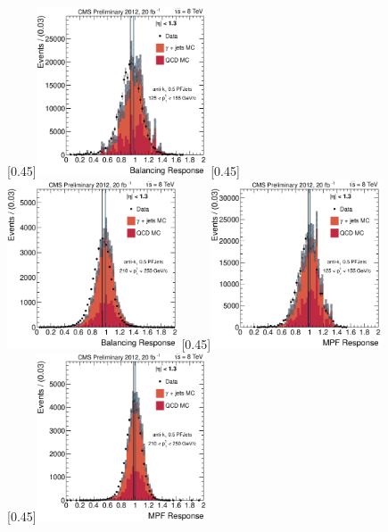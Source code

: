 \begin{figure}[p]
    \centering
    \subcaptionbox{\label{fig:bal_eta013_pt_125_155}}[0.45\textwidth]{\includegraphics[width=0.45\textwidth]{chapitre4/figs/resp_balancing_eta013_ptPhot_125_155.eps}}\hfill
    \subcaptionbox{\label{fig:bal_eta013_pt_210_250}}[0.45\textwidth]{\includegraphics[width=0.45\textwidth]{chapitre4/figs/resp_balancing_eta013_ptPhot_210_250.eps}}
    \subcaptionbox{\label{fig:mpf_eta013_pt_125_155}}[0.45\textwidth]{\includegraphics[width=0.45\textwidth]{chapitre4/figs/resp_mpf_eta013_ptPhot_125_155.eps}}\hfill
    \subcaptionbox{\label{fig:mpf_eta013_pt_210_250}}[0.45\textwidth]{\includegraphics[width=0.45\textwidth]{chapitre4/figs/resp_mpf_eta013_ptPhot_210_250.eps}}

\end{figure}
